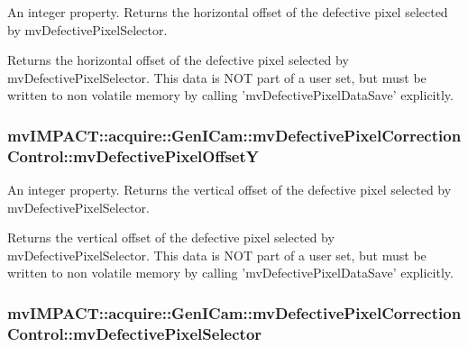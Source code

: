 An integer property. Returns the horizontal offset of the defective pixel selected by mv\+Defective\+Pixel\+Selector. 

Returns the horizontal offset of the defective pixel selected by mv\+Defective\+Pixel\+Selector. This data is N\+O\+T part of a user set, but must be written to non volatile memory by calling 'mv\+Defective\+Pixel\+Data\+Save' explicitly. \hypertarget{classmv_i_m_p_a_c_t_1_1acquire_1_1_gen_i_cam_1_1mv_defective_pixel_correction_control_a168ab762c3f2b0026c3c40b2eea7bc9b}{
\subsubsection[{mv\+Defective\+Pixel\+Offset\+Y}]{ mv\+I\+M\+P\+A\+C\+T\+::acquire\+::\+Gen\+I\+Cam\+::mv\+Defective\+Pixel\+Correction\+Control\+::mv\+Defective\+Pixel\+Offset\+Y}}\label{classmv_i_m_p_a_c_t_1_1acquire_1_1_gen_i_cam_1_1mv_defective_pixel_correction_control_a168ab762c3f2b0026c3c40b2eea7bc9b}


An integer property. Returns the vertical offset of the defective pixel selected by mv\+Defective\+Pixel\+Selector. 

Returns the vertical offset of the defective pixel selected by mv\+Defective\+Pixel\+Selector. This data is N\+O\+T part of a user set, but must be written to non volatile memory by calling 'mv\+Defective\+Pixel\+Data\+Save' explicitly. \hypertarget{classmv_i_m_p_a_c_t_1_1acquire_1_1_gen_i_cam_1_1mv_defective_pixel_correction_control_aa641704fe6e34fd75e1a894674cd0641}{
\subsubsection[{mv\+Defective\+Pixel\+Selector}]{ mv\+I\+M\+P\+A\+C\+T\+::acquire\+::\+Gen\+I\+Cam\+::mv\+Defective\+Pixel\+Correction\+Control\+::mv\+Defective\+Pixel\+Selector}}\label{classmv_i_m_p_a_c_t_1_1acquire_1_1_gen_i_cam_1_1mv_defective_pixel_correction_control_aa641704fe6e34fd75e1a894674cd0641}


